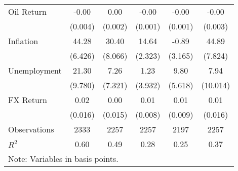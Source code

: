 \begin{table}[htbp]
\begin{tabular*}{0.8\hsize}{@{\hskip\tabcolsep\extracolsep\fill}l*{5}{c}}
\addlinespace
Oil Return          &       -0.00         &        0.00         &       -0.00\sym{**} &       -0.00         &       -0.00         \\
                    &     (0.004)         &     (0.002)         &     (0.001)         &     (0.001)         &     (0.003)         \\
\addlinespace
Inflation           &       44.28\sym{***}&       30.40\sym{**} &       14.64\sym{***}&       -0.89         &       44.89\sym{***}\\
                    &     (6.426)         &     (8.066)         &     (2.323)         &     (3.165)         &     (7.824)         \\
\addlinespace
Unemployment        &       21.30\sym{*}  &        7.26         &        1.23         &        9.80         &        7.94         \\
                    &     (9.780)         &     (7.321)         &     (3.932)         &     (5.618)         &    (10.014)         \\
\addlinespace
FX Return           &        0.02         &        0.00         &        0.01         &        0.01         &        0.01         \\
                    &     (0.016)         &     (0.015)         &     (0.008)         &     (0.009)         &     (0.016)         \\
\midrule
Observations        &        2333         &        2257         &        2257         &        2197         &        2257         \\
\(R^{2}\)           &        0.60         &        0.49         &        0.28         &        0.25         &        0.37         \\
\bottomrule
\multicolumn{6}{l}{\footnotesize Note: Variables in basis points.}\\
\end{tabular*}
\end{table}
